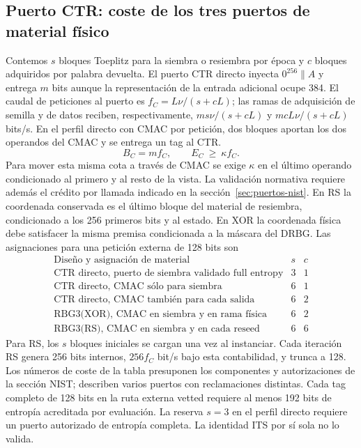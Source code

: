 \subsection{Puerto CTR: coste de los tres puertos de material físico}
\label{sec:port-rate-ctr}
Contemos \(s\) bloques Toeplitz para la siembra o resiembra por época y
\(c\) bloques adquiridos por palabra devuelta. El puerto CTR directo inyecta
\(0^{256}\|A\) y entrega \(m\) bits aunque la representación de la
entrada adicional ocupe 384. El caudal de peticiones al
puerto es \(f_C=L\nu/(s+cL)\); las ramas de adquisición de
semilla y de datos reciben, respectivamente, \(ms\nu/(s+cL)\) y
\(mcL\nu/(s+cL)\) bits/s. En el perfil directo con CMAC por petición,
dos bloques aportan los dos operandos del CMAC y se entrega un tag al CTR.
\[
 B_C=m f_C,\qquad E_C\ \ge\ \kappa f_C .
\]
Para mover esta misma cota a través de CMAC se exige \(\kappa\) en el
último operando condicionado al primero y al resto de la vista.
La validación normativa requiere además el crédito por llamada indicado en
la sección~\ref{sec:puertos-nist}. En RS la coordenada conservada es el
último bloque del material de resiembra, condicionado a los 256 primeros
bits y al estado. En XOR la coordenada física debe satisfacer la misma
premisa condicionada a la máscara del DRBG. Las asignaciones para una
petición externa de 128 bits son
\[
\begin{array}{lrr}
\text{Diseño y asignación de material} & s & c\\
\hline
\text{CTR directo, puerto de siembra validado full entropy} &3&1\\
\text{CTR directo, CMAC sólo para siembra} &6&1\\
\text{CTR directo, CMAC también para cada salida} &6&2\\
\text{RBG3(XOR), CMAC en siembra y en rama física} &6&2\\
\text{RBG3(RS), CMAC en siembra y en cada reseed} &6&6
\end{array}
\]
Para RS, los \(s\) bloques iniciales se cargan una vez al instanciar. Cada
iteración RS genera 256 bits internos, \(256 f_C\) bit/s bajo esta
contabilidad, y trunca a 128. Los números de coste de la tabla presuponen
los componentes y autorizaciones de la sección NIST; describen varios
puertos con reclamaciones distintas. Cada tag completo de 128 bits en la
ruta externa vetted requiere al menos 192 bits de entropía acreditada por
evaluación. La reserva \(s=3\) en el perfil directo requiere un puerto
autorizado de entropía completa. La identidad ITS por sí sola no lo valida.

